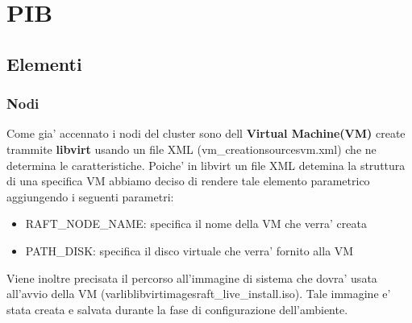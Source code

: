 
\section{PIB}
\subsection{Elementi}
\subsubsection{Nodi}
Come gia' accennato i nodi del cluster sono dell \textbf{Virtual Machine(VM)} create trammite 
\textbf{libvirt} usando un file XML (vm\_creation\/sources\/vm.xml) che ne determina le caratteristiche.
Poiche' in libvirt un file XML detemina la struttura di una specifica VM abbiamo deciso di rendere
tale elemento parametrico aggiungendo i seguenti parametri:
\begin{itemize}
    \item RAFT\_NODE\_NAME: specifica il nome della VM che verra' creata
    \item PATH\_DISK: specifica il disco virtuale che verra' fornito alla VM
\end{itemize}

Viene inoltre precisata il percorso all'immagine di sistema che dovra' usata all'avvio della VM
(\/var\/lib\/libvirt\/images\/raft\_live\_install.iso). Tale immagine e' stata creata e salvata durante la fase 
di configurazione dell'ambiente.



